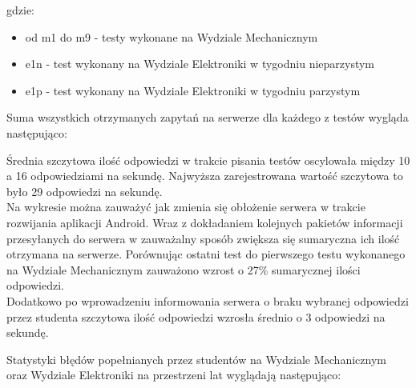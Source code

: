 \documentclass[eng]{mgr}
\begin{document}
		gdzie:
		\begin{itemize}
			\item od m1 do m9 - testy wykonane na Wydziale Mechanicznym
			\item e1n - test wykonany na Wydziale Elektroniki w tygodniu nieparzystym
			\item e1p - test wykonany na Wydziale Elektroniki w tygodniu parzystym
		\end{itemize}

		Suma wszystkich otrzymanych zapytań na serwerze dla każdego z testów wygląda następująco:
		
		\begin{center}
		\end{center}
	
		Średnia szczytowa ilość odpowiedzi w trakcie pisania testów oscylowała między 10 a 16 odpowiedziami na sekundę. Najwyższa zarejestrowana wartość szczytowa to było 29 odpowiedzi na sekundę.\\
		Na wykresie można zauważyć jak zmienia się obłożenie serwera w trakcie rozwijania aplikacji Android. Wraz z dokładaniem kolejnych pakietów informacji przesyłanych do serwera w zauważalny sposób zwiększa się sumaryczna ich ilość otrzymana na serwerze. Porównując ostatni test do pierwszego testu wykonanego na Wydziale Mechanicznym zauważono wzrost o 27\% sumarycznej ilości odpowiedzi.\\
		Dodatkowo po wprowadzeniu informowania serwera o braku wybranej odpowiedzi przez studenta szczytowa ilość odpowiedzi wzrosła średnio o 3 odpowiedzi na sekundę.
	
		Statystyki błędów popełnianych przez studentów na Wydziale Mechanicznym oraz Wydziale Elektroniki na przestrzeni lat wyglądają następująco:
		
\end{document}
